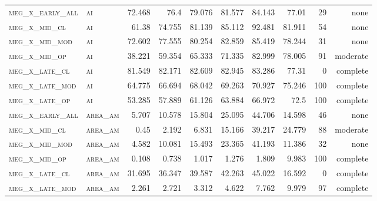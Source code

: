 \begin{landscape}
\begin{center}
\begin{footnotesize}
\begin{longtable}{llrrrrr|rrr}
\textsc{meg\_x\_early\_all} & \textsc{ai        }    & 72.468   & 76.4     & 79.076   & 81.577   & 84.143    & 77.01         & 29            & none             \\
\textsc{meg\_x\_mid\_cl   } & \textsc{ai        }    & 61.38    & 74.755   & 81.139   & 85.112   & 92.481    & 81.911        & 54            & none               \\
\textsc{meg\_x\_mid\_mod  } & \textsc{ai        }    & 72.602   & 77.555   & 80.254   & 82.859   & 85.419    & 78.244        & 31            & none             \\
\textsc{meg\_x\_mid\_op   } & \textsc{ai        }    & 38.221   & 59.354   & 65.333   & 71.335   & 82.999    & 78.005        & 91            & moderate              \\
\textsc{meg\_x\_late\_cl  } & \textsc{ai        }    & 81.549   & 82.171   & 82.609   & 82.945   & 83.286    & 77.31         & 0             & complete            \\
\textsc{meg\_x\_late\_mod } & \textsc{ai        }    & 64.775   & 66.694   & 68.042   & 69.263   & 70.927    & 75.246        & 100           & complete             \\
\textsc{meg\_x\_late\_op  } & \textsc{ai        }    & 53.285   & 57.889   & 61.126   & 63.884   & 66.972    & 72.5          & 100           & complete             \\
\textsc{meg\_x\_early\_all} & \textsc{area\_am  }    & 5.707    & 10.578   & 15.804   & 25.095   & 44.706    & 14.598        & 46            & none              \\
\textsc{meg\_x\_mid\_cl   } & \textsc{area\_am  }    & 0.45     & 2.192    & 6.831    & 15.166   & 39.217    & 24.779        & 88            & moderate              \\
\textsc{meg\_x\_mid\_mod  } & \textsc{area\_am  }    & 4.582    & 10.081   & 15.493   & 23.365   & 41.193    & 11.386        & 32            & none             \\
\textsc{meg\_x\_mid\_op   } & \textsc{area\_am  }    & 0.108    & 0.738    & 1.017    & 1.276    & 1.809     & 9.983         & 100           & complete             \\
\textsc{meg\_x\_late\_cl  } & \textsc{area\_am  }    & 31.695   & 36.347   & 39.587   & 42.263   & 45.022    & 16.592        & 0             & complete            \\
\textsc{meg\_x\_late\_mod } & \textsc{area\_am  }    & 2.261    & 2.721    & 3.312    & 4.622    & 7.762     & 9.979         & 97            & complete              \\

\end{longtable}
\end{footnotesize}
\end{center}
\end{landscape}
